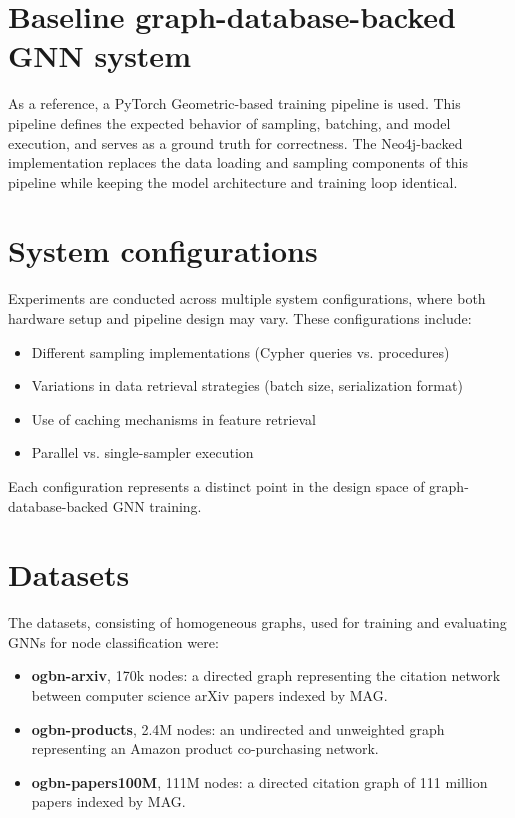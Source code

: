 \documentclass[PhD,single]{uclathes}
\begin{document}
\section{Baseline graph-database-backed GNN system}
As a reference, a PyTorch Geometric-based training pipeline is used. This
pipeline defines the expected behavior of sampling, batching, and model
execution, and serves as a ground truth for correctness. The Neo4j-backed
implementation replaces the data loading and sampling components of this
pipeline while keeping the model architecture and training loop identical.

\section{System configurations}
Experiments are conducted across multiple system configurations, where both
hardware setup and pipeline design may vary. These configurations include:

\begin{itemize}
    \item Different sampling implementations (Cypher queries vs. procedures)
    \item Variations in data retrieval strategies (batch size, serialization format)
    \item Use of caching mechanisms in feature retrieval
    \item Parallel vs. single-sampler execution
\end{itemize}

Each configuration represents a distinct point in the design space of
graph-database-backed GNN training.

\section{Datasets}
The datasets, consisting of homogeneous graphs, used for training and
evaluating GNNs for node classification were:

\begin{itemize}
    \item \textbf{ogbn-arxiv}, 170k nodes: a directed graph representing the citation network between computer science arXiv papers indexed by MAG.
    \item \textbf{ogbn-products}, 2.4M nodes: an undirected and unweighted graph representing an Amazon product co-purchasing network.
    \item \textbf{ogbn-papers100M}, 111M nodes: a directed citation graph of 111 million papers indexed by MAG.
\end{itemize}
\end{document}
